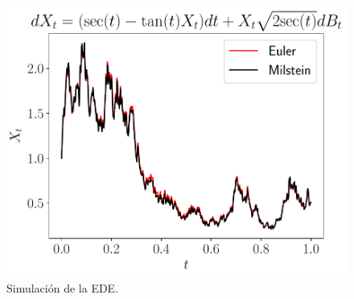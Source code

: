 \documentclass[fleqn]{article}
\begin{document}
\begin{enumerate}
\begin{figure}[H]
    \centering
    \includegraphics[scale=0.8]{files/result_punto4.pdf}
    \caption{Simulación de la EDE.}
\end{figure}
\end{enumerate}


\end{document}
